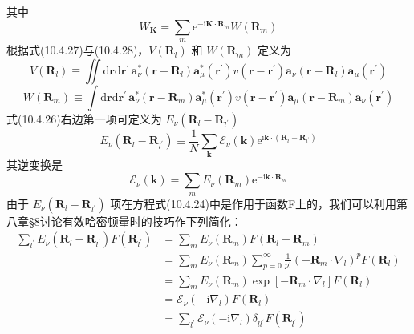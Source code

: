 其中
\begin{equation*}
  W_{\boldsymbol{K}}=\sum_{m}\mathrm{e}^{-\mathrm{i}\boldsymbol{K}\cdot\boldsymbol{R}_{m}}W(\boldsymbol{R}_{m})
\end{equation*}
根据式(10.4.27)与(10.4.28)，$V(\boldsymbol{R}_{l})$ 和 $W(\boldsymbol{R}_{m})$ 定义为
\begin{equation}
  V(\boldsymbol{R}_{l})\equiv\iint\mathrm{d}\boldsymbol{r}\mathrm{d}\boldsymbol{r}^{\prime}\,
  \boldsymbol{a}_{\nu}^{*}(\boldsymbol{r}-\boldsymbol{R}_{l})
  \boldsymbol{a}_{\mu}^{*}(\boldsymbol{r}^{\prime})
  v(\boldsymbol{r}-\boldsymbol{r}^{\prime})
  \boldsymbol{a}_{\nu}(\boldsymbol{r}-\boldsymbol{R}_{l})
  \boldsymbol{a}_{\mu}(\boldsymbol{r}^{\prime})
\end{equation}
\begin{equation}
  W(\boldsymbol{R}_{m})\equiv\int\mathrm{d}\boldsymbol{r}\mathrm{d}\boldsymbol{r}^{\prime}\,
  \boldsymbol{a}_{\nu}^{*}(\boldsymbol{r}-\boldsymbol{R}_{m})
  \boldsymbol{a}_{\mu}^{*}(\boldsymbol{r}^{\prime})
  v(\boldsymbol{r}-\boldsymbol{r}^{\prime})
  \boldsymbol{a}_{\mu}(\boldsymbol{r}-\boldsymbol{R}_{m})
  \boldsymbol{a}_{\nu}(\boldsymbol{r}^{\prime})
\end{equation}
式(10.4.26)右边第一项可定义为 $E_{\nu}(\boldsymbol{R}_{l}-\boldsymbol{R}_{l^{\prime}})$
\begin{equation}
  E_{\nu}(\boldsymbol{R}_{l}-\boldsymbol{R}_{l^{\prime}})\equiv\frac{1}{N}
  \sum_{\boldsymbol{k}}\mathscr{E}_{\nu}(\boldsymbol{k})
  \mathrm{e}^{\mathrm{i}\boldsymbol{k}\cdot(\boldsymbol{R}_{l}-\boldsymbol{R}_{l^{\prime}})}
\end{equation}
其逆变换是
\begin{equation}
  \mathscr{E}_{\nu}(\boldsymbol{k})=\sum_{m}E_{\nu}(\boldsymbol{R}_{m})
  \mathrm{e}^{-\mathrm{i}\boldsymbol{k}\cdot\boldsymbol{R}_{m}}
\end{equation}
由于 $E_{\nu}(\boldsymbol{R}_{l}-\boldsymbol{R}_{l^{\prime}})$ 项在方程式(10.4.24)中是作用于函数F上的，我们可以利用第八章§8讨论有效哈密顿量时的技巧作下列简化：
\begin{equation}
\begin{aligned}
  \sum_{l^{\prime}}E_{\nu}(\boldsymbol{R}_{l}-\boldsymbol{R}_{l^{\prime}})F(\boldsymbol{R}_{l^{\prime}})
  &=\sum_{m}E_{\nu}(\boldsymbol{R}_{m})F(\boldsymbol{R}_{l}-\boldsymbol{R}_{m})\\
  &=\sum_{m}E_{\nu}(\boldsymbol{R}_{m})\sum_{p=0}^{\infty}\frac{1}{p!}
  (-\boldsymbol{R}_{m}\cdot\nabla_{l})^{p}F(\boldsymbol{R}_{l})\\
  &=\sum_{m}E_{\nu}(\boldsymbol{R}_{m})
  \exp[-\boldsymbol{R}_{m}\cdot\nabla_{l}]F(\boldsymbol{R}_{l})\\
  &=\mathscr{E}_{\nu}(-\mathrm{i}\nabla_{l})F(\boldsymbol{R}_{l})\\
  &=\sum_{l^{\prime}}\mathscr{E}_{\nu}(-\mathrm{i}\nabla_{l})\delta_{ll^{\prime}}F(\boldsymbol{R}_{l^{\prime}})
\end{aligned}
\end{equation}
